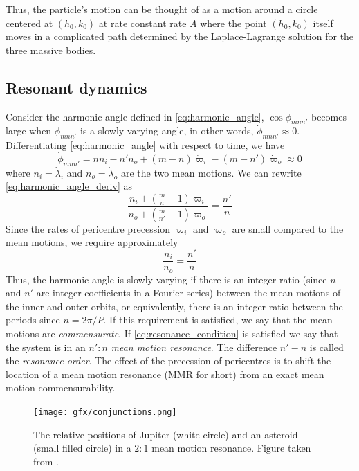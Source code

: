 \documentclass[twoside,openright,titlepage,numbers=noenddot,headinclude,%
                footinclude=true,cleardoublepage=empty,abstractoff, 
                BCOR=5mm,paper=a4,fontsize=11pt,%
                american,%
                ]{scrreprt}%
\begin{document}
Thus, the particle's motion can be thought of as a motion around 
a circle centered at $(h_0,k_0)$ at rate constant rate $A$ where
the point $(h_0,k_0)$ itself moves in a complicated path determined
by the Laplace-Lagrange solution for the three massive bodies. 

\subsection{Resonant dynamics}
\label{sub:Resonant_dynamics}
Consider the harmonic angle defined in \cref{eq:harmonic_angle}, 
$\cos\phi_{mnn'}$ becomes large when $\phi_{mnn'}$ is a slowly
varying angle, in other words, $\dot{\phi}_{mnn'}\approx 0$. 
Differentiating \cref{eq:harmonic_angle} with respect to time,
we have
\begin{equation}
    \dot{\phi}_{mnn'}=nn_i-n'n_o+(m-n)\dot{\varpi}_i-(m-n')\dot{
        \varpi}_o\approx 0
    \label{eq:harmonic_angle_deriv}
\end{equation}
where $n_i=\dot{\lambda}_i$ and $n_o=\dot{\lambda}_o$ are the two
mean motions. We can rewrite \cref{eq:harmonic_angle_deriv} as
\begin{equation}
    \frac{n_i+( \frac{m}{n} -1)\dot{\varpi}_i}
    {n_o + ( \frac{m}{n'}-1)\dot{\varpi}_o } 
    = \frac{n'}{n} 
    \label{eq:resonance_condition}
\end{equation}
Since the rates of pericentre precession $\dot{\varpi}_i$ 
and $\dot{\varpi}_o$ are small compared to the mean motions, we
require approximately
\begin{equation}
    \frac{n_i}{n_o} = \frac{n'}{n} 
\end{equation}
Thus, the harmonic angle is slowly varying if there is an integer 
ratio (since $n$ and $n'$ are integer coefficients in a Fourier 
series) between the mean motions of
the inner and outer orbits, or equivalently, there is an integer
ratio between the periods since $n=2\pi/P$. If this 
requirement is satisfied, we say that the mean motions
are \emph{commensurate}. If \cref{eq:resonance_condition} is 
satisfied we say that the system is in an $n':n$ 
\emph{mean motion resonance}.
The difference $n'-n$ is called the \emph{resonance order}.
The effect of the precession of pericentres is to shift the location
of a mean motion resonance (MMR for short) from an exact 
mean motion commensurability.
\begin{figure}[htb]
\centering
    \texttt{[image: gfx/conjunctions.png]}
    \caption[Geometry of a mean--motion resonance.]{The relative positions 
    of Jupiter (white circle) and 
    an asteroid (small filled circle) in a $2:1$ mean motion
    resonance. Figure taken from \citet{murray}.}
\label{fig:conjuctions}
\end{figure}
\end{document}
